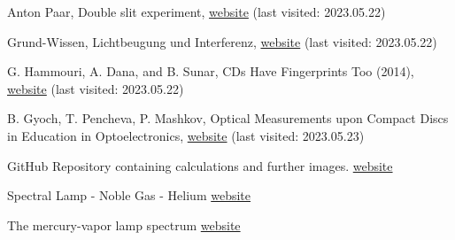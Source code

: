 \documentclass[12pt,a4paper]{article}
\begin{document}
\begin{thebibliography}{99}

Anton Paar, Double slit experiment, \href{https://wiki.anton-paar.com/ch-de/doppelspaltexperiment/}{website} (last visited: 2023.05.22)

Grund-Wissen, Lichtbeugung und Interferenz, \href{https://www.grund-wissen.de/physik/optik/wellenoptik.html}{website} (last visited: 2023.05.22)

G. Hammouri, A. Dana, and B. Sunar, CDs Have Fingerprints Too (2014), \href{https://www.researchgate.net/figure/Lands-and-pits-image-using-a-scanning-electron-microscope_fig3_221291847}{website} (last visited: 2023.05.22)

B. Gyoch, T. Pencheva, P. Mashkov, Optical Measurements upon Compact Discs in Education in Optoelectronics, \href{https://ieeexplore.ieee.org/stamp/stamp.jsp?tp=&arnumber=5547333&tag=1}{website} (last visited: 2023.05.23)

GitHub Repository containing calculations and further images. \href{https://github.com/Noothless/Do-it-yourself-Spectrometer}{website}

Spectral Lamp - Noble Gas - Helium \href{http://www.lamptech.co.uk/Spec%20Sheets/D%20SP%20Philips%20LL%20He.htm}{website}

The mercury-vapor lamp spectrum \href{https://www.researchgate.net/figure/The-mercury-vapor-lamp-spectrum_fig4_316789076}{website}


\end{thebibliography}
\end{document}
